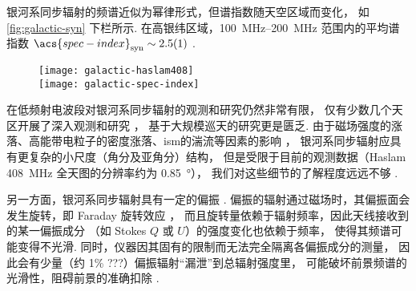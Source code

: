 银河系同步辐射的频谱近似为幂律形式，但谱指数随天空区域而变化，
如\autoref{fig:galactic-syn} 下栏所示.
在高银纬区域，\SIrange{100}{200}{\MHz} 范围内的平均谱指数
$\acs{spec-index}_{\R{syn}} \sim \num{2.5 +- 0.1}$ \cite{rogers2008}.

\begin{figure}[htp]
  \centering
  \texttt{[image: galactic-haslam408]}
  \\\medskip
  \texttt{[image: galactic-spec-index]}
  \label{fig:galactic-syn}
\end{figure}

在低频射电波段对银河系同步辐射的观测和研究仍然非常有限，
仅有少数几个天区开展了深入观测和研究
\cite{bernardi2009,ghosh2012,iacobelli2013,choudhuri2017}，
基于大规模巡天的研究更是匮乏.
由于磁场强度的涨落、高能带电粒子的密度涨落、\ac{ism}的湍流等因素的影响
\cite{waelkens2009,lazarian2012syn,iacobelli2013}，
银河系同步辐射应具有更复杂的小尺度（角分及亚角分）结构，
但是受限于目前的观测数据（Haslam \SI{408}{\MHz} 全天图的分辨率约为 \SI{0.85}{\degree}），
我们对这些细节的了解程度远远不够 \cite{ali2016}.

另一方面，银河系同步辐射具有一定的偏振 \cite{bernardi2009,jelic2014,gehlot2018}.
偏振的辐射通过磁场时，其偏振面会发生旋转，即 Faraday 旋转效应 \cite{rybicki1979}，
而且旋转量依赖于辐射频率，因此天线接收到的某一偏振成分
（如 Stokes $Q$ 或 $U$）的强度变化也依赖于频率，
使得其频谱可能变得不光滑.
同时，仪器因其固有的限制而无法完全隔离各偏振成分的测量，
因此会有少量（约 1\% ???）偏振辐射\enquote{漏泄}到总辐射强度里，
可能破坏前景频谱的光滑性，阻碍前景的准确扣除
\cite{jelic2010,nunhokee2017,gehlot2018,spinelli2018}.

